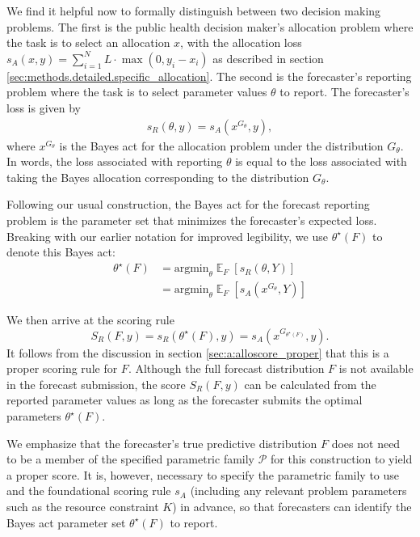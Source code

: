 \documentclass{article}\usepackage[]{graphicx}\usepackage[]{xcolor}
\DeclareMathOperator{\Ex}{\mathbb{E}}
\begin{document}
We find it helpful now to formally distinguish between two decision making problems. The first is the public health
decision maker's allocation problem where the task is to select an allocation $x$, with the allocation loss $s_A(x, y) =
\sum_{i=1}^N L \cdot \max(0, y_i - x_i)$ as described in section \ref{sec:methods.detailed.specific_allocation}. The
second is the forecaster's reporting problem where the task is to select parameter values $\theta$ to report. The
forecaster's loss is given by
\begin{align}
s_R(\theta, y) = s_A(x^{G_\theta}, y), \label{eqn:forecaster_theta_loss}
\end{align}
where $x^{G_\theta}$ is the Bayes act for the allocation problem under the distribution $G_\theta$. In words, the loss
associated with reporting $\theta$ is equal to the loss associated with taking the Bayes allocation corresponding to the
distribution $G_\theta$.

Following our usual construction, the Bayes act for the forecast reporting problem is the parameter set that minimizes
the forecaster's expected loss. Breaking with our earlier notation for improved legibility, we use $\theta^\star(F)$ to
denote this Bayes act:
\begin{align*}
\theta^\star(F) &= \text{argmin}_\theta \Ex_F [s_R(\theta, Y)] \\
&= \text{argmin}_\theta \Ex_F [s_A(x^{G_\theta}, Y)]
\end{align*}

We then arrive at the scoring rule
$$S_R(F, y) = s_R(\theta^\star(F), y) = s_A(x^{G_{\theta^\star(F)}}, y).$$
It follows from the discussion in section \ref{sec:a:alloscore_proper} that this is a proper scoring rule for $F$.
Although the full forecast distribution $F$ is not available in the forecast submission, the score $S_R(F, y)$ can be
calculated from the reported parameter values as long as the forecaster submits the optimal parameters
$\theta^\star(F)$.

We emphasize that the forecaster's true predictive distribution $F$ does not need to be a member of the specified
parametric family $\mathcal{P}$ for this construction to yield a proper score. It is, however, necessary to specify the
parametric family to use and the foundational scoring rule $s_A$ (including any relevant problem parameters such as the
resource constraint $K$) in advance, so that forecasters can identify the Bayes act parameter set $\theta^\star(F)$ to
report.
\end{document}
